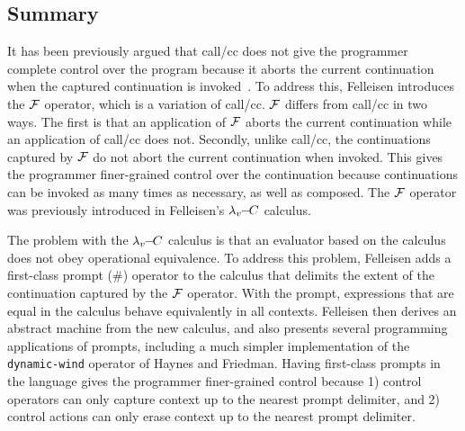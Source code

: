 \documentclass[letterpaper]{llncs}
\begin{document}

\subsection*{Summary}
It has been previously argued that call/cc does not give the programmer complete control over the program because it aborts the current continuation when the captured continuation is invoked~\cite{Felleisen1987SyntacticTheory}. To address this, Felleisen introduces the $ \mathcal{F} $ operator, which is a variation of call/cc. $ \mathcal{F} $ differs from call/cc in two ways. The first is that an application of $ \mathcal{F} $ aborts the current continuation while an application of call/cc does not. Secondly, unlike call/cc, the continuations captured by $ \mathcal{F} $ do not abort the current continuation when invoked. This gives the programmer finer-grained control over the continuation because continuations can be invoked as many times as necessary, as well as composed. The $ \mathcal{F} $ operator was previously introduced in Felleisen's $ \lambda_v\!\!-\!\!C $ calculus.

The problem with the $ \lambda_v\!\!-\!\!C $ calculus is that an evaluator based on the calculus does not obey operational equivalence. To address this problem, Felleisen adds a first-class prompt (\#) operator to the calculus that delimits the extent of the continuation captured by the $ \mathcal{F} $ operator. With the prompt, expressions that are equal in the calculus behave equivalently in all contexts. Felleisen then derives an abstract machine from the new calculus, and also presents several programming applications of prompts, including a much simpler implementation of the \texttt{dynamic-wind} operator of Haynes and Friedman. Having first-class prompts in the language gives the programmer finer-grained control because 1) control operators can only capture context up to the nearest prompt delimiter, and 2) control actions can only erase context up to the nearest prompt delimiter.
\end{document}
